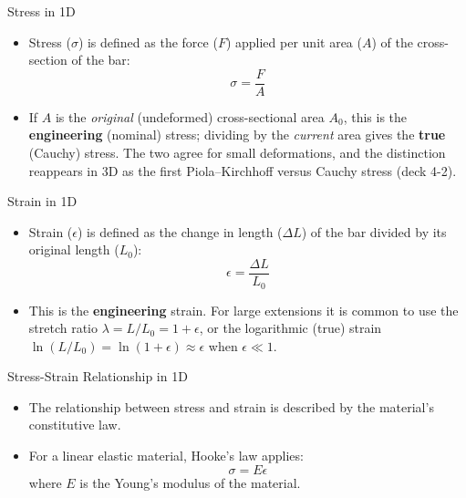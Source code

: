 \documentclass[aspectratio=169,11pt]{beamer}
\begin{document}
\begin{frame}{Stress in 1D}
    \begin{itemize}
        \item Stress ($\sigma$) is defined as the force ($F$) applied per unit area ($A$) of the cross-section of the bar:
        \begin{equation*}
        \sigma = \frac{F}{A}
        \end{equation*}
        \item If $A$ is the \emph{original} (undeformed) cross-sectional area $A_0$, this is the \textbf{engineering} (nominal) stress; dividing by the \emph{current} area gives the \textbf{true} (Cauchy) stress. The two agree for small deformations, and the distinction reappears in 3D as the first Piola--Kirchhoff versus Cauchy stress (deck 4-2).
    \end{itemize}
\end{frame}


\begin{frame}{Strain in 1D}
    \begin{itemize}
        \item Strain ($\epsilon$) is defined as the change in length ($\Delta L$) of the bar divided by its original length ($L_0$):
        \begin{equation*}
        \epsilon = \frac{\Delta L}{L_0}
        \end{equation*}
        \item This is the \textbf{engineering} strain. For large extensions it is common to use the stretch ratio $\lambda = L/L_0 = 1+\epsilon$, or the logarithmic (true) strain $\ln(L/L_0) = \ln(1+\epsilon) \approx \epsilon$ when $\epsilon \ll 1$.
    \end{itemize}
\end{frame}

\begin{frame}{Stress-Strain Relationship in 1D}
    \begin{itemize}
        \item The relationship between stress and strain is described by the material's constitutive law.
        \item For a linear elastic material, Hooke's law applies:
        \begin{equation*}
        \sigma = E \epsilon
        \end{equation*}
        where $E$ is the Young's modulus of the material.
    \end{itemize}
\end{frame}
\end{document}

